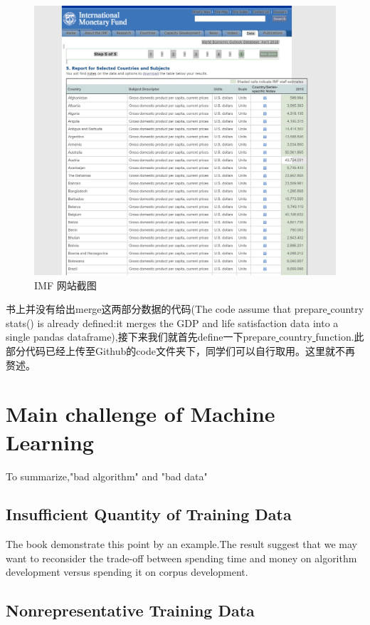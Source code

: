 \documentclass[UTF8]{ctexart}
\begin{document}
\begin{figure}[H]
\centering
\includegraphics[width = 6in]{imf.JPG}
\caption{IMF 网站截图}
\end{figure}

书上并没有给出merge这两部分数据的代码(The code assume that prepare\underline{ }country\underline{ }stats() is already defined:it merges the GDP and life satisfaction data into a single pandas dataframe),接下来我们就首先define一下prepare\underline{ }country\underline{ } function.此部分代码已经上传至Github的code文件夹下，同学们可以自行取用。这里就不再赘述。

\section{Main challenge of Machine Learning}
To summarize,"bad algorithm" and "bad data"
\subsection{Insufficient Quantity of Training Data}
The book demonstrate this point by an example.The result suggest that we may want to reconsider the trade-off between spending time and money on algorithm development versus spending it on corpus development.
\subsection{Nonrepresentative Training Data}
\end{document}
